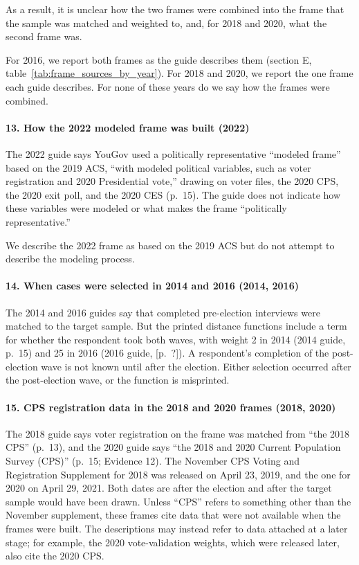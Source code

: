 \documentclass[12pt]{article}
\begin{document}
As a result, it is unclear how the two frames were combined into the frame that the sample was matched and weighted to, and, for 2018 and 2020, what the second frame was.

For 2016, we report both frames as the guide describes them (section E, table~\ref{tab:frame_sources_by_year}). For 2018 and 2020, we report the one frame each guide describes. For none of these years do we say how the frames were combined.

\paragraph*{13. How the 2022 modeled frame was built (2022)}
The 2022 guide says YouGov used a politically representative ``modeled frame'' based on the 2019 ACS, ``with modeled political variables, such as voter registration and 2020 Presidential vote,'' drawing on voter files, the 2020 CPS, the 2020 exit poll, and the 2020 CES (p.~15). The guide does not indicate how these variables were modeled or what makes the frame ``politically representative.''

We describe the 2022 frame as based on the 2019 ACS but do not attempt to describe the modeling process.

\paragraph*{14. When cases were selected in 2014 and 2016 (2014, 2016)}
The 2014 and 2016 guides say that completed pre-election interviews were matched to the target sample. But the printed distance functions include a term for whether the respondent took both waves, with weight 2 in 2014 (2014 guide, p.~15) and 25 in 2016 (2016 guide, [p.~?]). A respondent's completion of the post-election wave is not known until after the election. Either selection occurred after the post-election wave, or the function is misprinted.

\paragraph*{15. CPS registration data in the 2018 and 2020 frames (2018, 2020)}
The 2018 guide says voter registration on the frame was matched from ``the 2018 CPS'' (p.~13), and the 2020 guide says ``the 2018 and 2020 Current Population Survey (CPS)'' (p.~15; Evidence 12). The November CPS Voting and Registration Supplement for 2018 was released on April 23, 2019, and the one for 2020 on April 29, 2021. Both dates are after the election and after the target sample would have been drawn. Unless ``CPS'' refers to something other than the November supplement, these frames cite data that were not available when the frames were built. The descriptions may instead refer to data attached at a later stage; for example, the 2020 vote-validation weights, which were released later, also cite the 2020 CPS.
\end{document}
